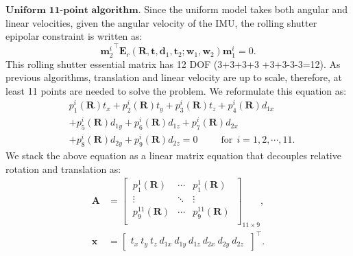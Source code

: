 \documentclass[10pt,twocolumn,letterpaper]{article}
\theoremstyle{definition}
\begin{document}
	
	\vspace{3mm}
	\noindent $\textbf{Uniform 11-point algorithm.}$
	Since the uniform model takes both angular and linear velocities, given the angular velocity of the IMU, the rolling shutter epipolar constraint is written as:
	\begin{equation}
	{\mathbf{m}_{2}^{i}}^{\top} \mathbf{E}_{r} (\mathbf{R},\mathbf{t},\mathbf{d}_1,\mathbf{t}_2;  \mathbf{w}_1,\mathbf{w}_2) \mathbf{m}_{1}^{i} = 0 .
	\label{eq:rolling_shutter_epipolar_geometry}
	\end{equation}
	This rolling shutter essential matrix has 12 DOF (3+3+3+3 +3+3-3-3=12).
	As  previous algorithms, translation and linear velocity are up to scale, therefore, at least 11 points are needed to solve the problem.
	We reformulate this equation as:
	\begin{equation}
	\begin{split}
	& p_{1}^i(\mathbf{R}) t_x + p_{2}^i(\mathbf{R}) t_y + p_{3}^i(\mathbf{R}) t_z + p_{4}^i(\mathbf{R}) d_{1x} \\ 
	& + p_{5}^i(\mathbf{R}) d_{1y} + p_{6}^i(\mathbf{R}) d_{1z} + p_{7}^i(\mathbf{R}) d_{2x}  \\
	& + p_{8}^i(\mathbf{R}) d_{2y} + p_{9}^i(\mathbf{R}) d_{2z} =   0    \ \ \ \ \ \ \ \ \ \ \ \text{for} \ \ i = 1,2,\cdots,11.
	\end{split}
	\end{equation}
	We stack the above equation as a linear matrix equation that decouples relative rotation and translation as:
	\begin{equation}
	\begin{split}
	\mathbf{A} &= 
	\begin{bmatrix}
	\ p_{1}^1(\mathbf{R}) & \cdots & p_{1}^1(\mathbf{R}) \ \\
	\ \vdots & \ddots & \vdots \ \\
	\ p_{9}^{11}(\mathbf{R}) & \cdots & p_{9}^{11}(\mathbf{R}) \ \\
	\end{bmatrix}_{11 \times 9} , 
	\\
	\mathbf{x} &= 
	\begin{bmatrix}
	t_x \ 
	t_y \
	t_z \
	d_{1x} \
	d_{1y} \
	d_{1z} \
	d_{2x} \
	d_{2y} \
	d_{2z} \
	\end{bmatrix}^{\top} .
	\end{split}
	\end{equation}
	
	
	
\end{document}
